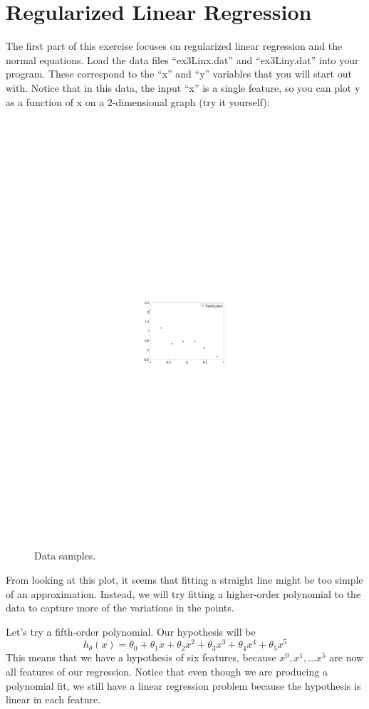 \documentclass[10pt,a4paper]{article}
\begin{document}
\section{Regularized Linear Regression}
%
  The first part of this exercise focuses on regularized linear regression and the normal equations. Load the data files ``ex3Linx.dat'' and ``ex3Liny.dat'' into your program. These correspond to the ``x'' and ``y'' variables that you will start out with. Notice that in this data, the input ``x'' is a single feature, so you can plot y as a function of x on a 2-dimensional graph (try it yourself):
  \begin{figure}[htb!]
    \centering
      \includegraphics[width=.7\columnwidth]{datasamples}
     \caption{Data samples.}
  \label{fig:lrdata}
  \end{figure}
  From looking at this plot, it seems that fitting a straight line might be too simple of an approximation. Instead, we will try fitting a higher-order polynomial to the data to capture more of the variations in the points.

  Let's try a fifth-order polynomial. Our hypothesis will be 
  \begin{equation}
    h_{\theta}(x)=\theta_{0}+\theta_{1}x+\theta_{2}x^{2}+\theta_{3}x^{3}+\theta_{4}x^{4}+\theta_{5}x^{5}
  \end{equation}
  This means that we have a hypothesis of six features, because  $x^0, x^1, \ldots x^5$ are now all features of our regression. Notice that even though we are producing a polynomial fit, we still have a linear regression problem because the hypothesis is linear in each feature.
\end{document}
